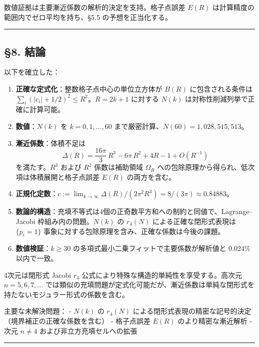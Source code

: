 \documentclass[a4paper,11pt]{ltjsarticle}
\theoremstyle{definition}
\providecommand{\tightlist}{\setlength{\itemsep}{0pt}\setlength{\parskip}{0pt}}
\begin{document}
数値証拠は主要漸近係数の解析的決定を支持。格子点誤差 \(E(R)\)
は計算精度の範囲内でゼロ平均を持ち、§5.5 の予想を正当化する。

\begin{center}\rule{0.5\linewidth}{0.5pt}\end{center}

\subsection{§8. 結論}\label{ux7d50ux8ad6-1}

以下を確立した：

\begin{enumerate}
\def\labelenumi{\arabic{enumi}.}
\tightlist
\item
  \textbf{正確な定式化}：整数格子点中心の単位立方体が \(B(R)\)
  に包含される条件は \(\sum_i (|c_i|+1/2)^2 \le R^2\)。\(R = 2k+1\)
  に対する \(N(k)\) は対称性削減列挙で正確に計算可能。
\item
  \textbf{数値}：\(N(k)\) を \(k = 0, 1, \ldots, 60\)
  まで厳密計算、\(N(60) = 1{,}028{,}515{,}513\)。
\item
  \textbf{漸近係数}：体積不足は
  \[\Delta(R) = \frac{16\pi}{3}\, R^3 - 6\pi\, R^2 + 4R - 1 + O(R^{-1})\]
  を満たす。\(R^3\) および \(R^2\) 係数は補助領域 \(\Omega_R\)
  への包除原理から得られ、低次項は体積展開と格子点誤差 \(E(R)\)
  の両方を含む。
\item
  \textbf{正規化定数}：\(c := \lim_{k \to \infty} \Delta(R)/(2\pi^2 R^3) = 8/(3\pi) \approx 0.84883\)。
\item
  \textbf{数論的構造}：充填不等式は4個の正奇数平方和への制約と同値で、Lagrange--Jacobi
  枠組み内の問題。\(N(k)\) の \(r_4(N)\) による正確な閉形式表現は
  \(\{p_i = 1\}\) 事象に対する包除原理を含み、正確な係数は今後の課題。
\item
  \textbf{数値検証}：\(k \ge 30\)
  の多項式最小二乗フィットで主要係数が解析値と 0.024\% 以内で一致。
\end{enumerate}

4次元は閉形式 Jacobi \(r_4\)
公式により特殊な構造的単純性を享受する。高次元 \(n = 5, 6, 7, \ldots\)
では類似の充填問題が定式化可能だが、漸近係数は単純な閉形式を持たないモジュラー形式の係数を含む。

主要な未解決問題： - \(N(k)\) の \(r_4(N)\)
による閉形式表現の精密な記号的決定（境界補正の正確な係数を含む） -
格子点誤差 \(E(R)\) のより精密な漸近解析 - 次元 \(n \neq 4\)
および非立方充填セルへの拡張

\begin{center}\rule{0.5\linewidth}{0.5pt}\end{center}
\end{document}
